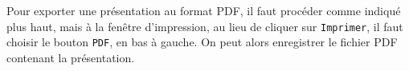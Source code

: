 Pour exporter une présentation au format PDF, il faut procéder comme indiqué plus haut, mais à la fenêtre d'impression, au lieu de cliquer sur \texttt{Imprimer}, il faut choisir le bouton \texttt{PDF}, en bas à gauche. On peut alors enregistrer le fichier PDF contenant la présentation.



\vfill
\phantom{rien}






